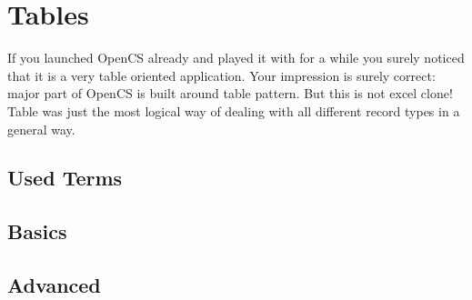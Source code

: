 \section{Tables}
If you launched OpenCS already and played it with for a while you surely noticed that it is a very table oriented application. Your impression is surely correct: major part of Open{CS} is built around table pattern. But this is not excel clone! Table was just the most logical way of dealing with all different record types in a general way.
\subsection{Used Terms}

\begin{description}
\end{description}

\subsection{Basics}

\subsection{Advanced}
